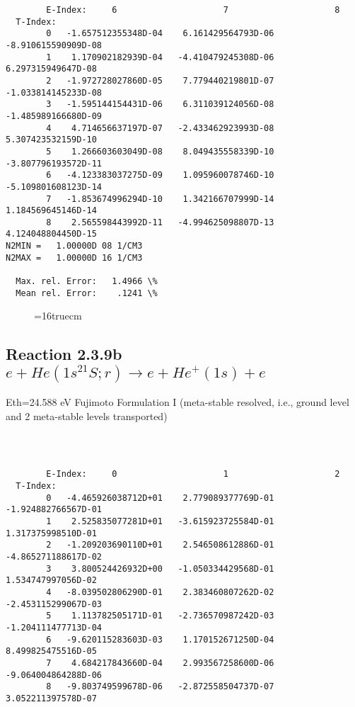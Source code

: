 \documentclass[12pt,dvipdfmx]{article}
\begin{document}
{\begin{small}
\begin{verbatim}
        E-Index:     6                     7                     8
  T-Index:
        0   -1.657512355348D-04    6.161429564793D-06   -8.910615590909D-08
        1    1.170902182939D-04   -4.410479245308D-06    6.297315949647D-08
        2   -1.972728027860D-05    7.779440219801D-07   -1.033814145233D-08
        3   -1.595144154431D-06    6.311039124056D-08   -1.485989166680D-09
        4    4.714656637197D-07   -2.433462923993D-08    5.307423532159D-10
        5    1.266603603049D-08    8.049435558339D-10   -3.807796193572D-11
        6   -4.123383037275D-09    1.095960078746D-10   -5.109801608123D-14
        7   -1.853674996294D-10    1.342166707999D-14    1.184569645146D-14
        8    2.565598443992D-11   -4.994625098807D-13    4.124048804450D-15
N2MIN =   1.00000D 08 1/CM3
N2MAX =   1.00000D 16 1/CM3

  Max. rel. Error:   1.4966 \%
  Mean rel. Error:    .1241 \%

\end{verbatim}\end{small}
\begin{figure} \label{2.3.9a}
\epsfxsize=16truecm
\end{figure}
\newpage




\subsection{
Reaction 2.3.9b  $e + He(1s^21S;r) \rightarrow e + He^+(1s) + e  $
}
Eth=24.588 eV
 Fujimoto Formulation I (meta-stable resolved, i.e., ground level and 2 meta-stable levels transported) \cite{kn:Fujimoto}

\begin{small}\begin{verbatim}



        E-Index:     0                     1                     2
  T-Index:
        0   -4.465926038712D+01    2.779089377769D-01   -1.924882766567D-01
        1    2.525835077281D+01   -3.615923725584D-01    1.317375998510D-01
        2   -1.209203690110D+01    2.546508612886D-01   -4.865271188617D-02
        3    3.800524426932D+00   -1.050334429568D-01    1.534747997056D-02
        4   -8.039502806290D-01    2.383460807262D-02   -2.453115299067D-03
        5    1.113782505171D-01   -2.736570987242D-03   -1.204111477713D-04
        6   -9.620115283603D-03    1.170152671250D-04    8.499825475516D-05
        7    4.684217843660D-04    2.993567258600D-06   -9.064004864288D-06
        8   -9.803749599678D-06   -2.872558504737D-07    3.052211397578D-07


\end{verbatim}
\end{small}}
\end{document}
